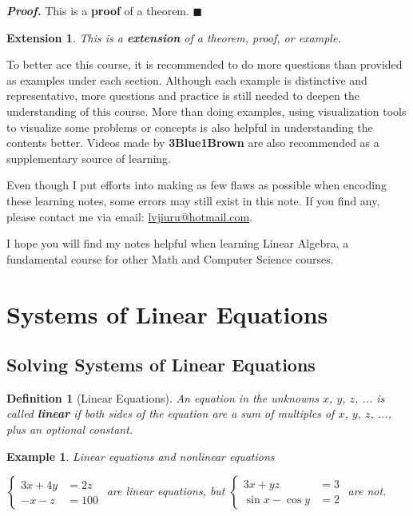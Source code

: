 \documentclass[12pt, a4paper]{article}
\newtheorem{df}{Definition}[subsection]
\newtheorem{eg}{Example}[subsection]
\newenvironment*{prf}{\indent\textbf{\textit{Proof. }}}{\hfill $\blacksquare$\par}
\newtheorem*{ext}{\indent Extension}
\begin{document}
\begin{prf}
	This is a \textbf{proof} of a theorem. 
\end{prf}
\begin{ext}
	This is a \textbf{extension} of a theorem, proof, or example. 	
\end{ext}

To better ace this course, it is recommended to do more questions than provided as examples under each section. Although each example is distinctive and representative, more questions and practice is still needed to deepen the understanding of this course. More than doing examples, using visualization tools to visualize some problems or concepts is also helpful in understanding the contents better. Videos made by \textbf{3Blue1Brown} are also recommended as a supplementary source of learning. 

Even though I put efforts into making as few flaws as possible when encoding these learning notes, some errors may still exist in this note. If you find any, please contact me via email: \url{lvjiuru@hotmail.com}. 

I hope you will find my notes helpful when learning Linear Algebra, a fundamental course for other Math and Computer Science courses. 


\newpage
\section{Systems of Linear Equations}
\subsection{Solving Systems of Linear Equations}

\begin{df}[Linear Equations]
An equation in the unknowns $x$, $y$, $z$, ... is called \textbf{linear} if both sides of the equation are a sum of multiples of $x$, $y$, $z$, ..., plus an optional constant. 
\end{df}
\begin{eg}
Linear equations and nonlinear equations\par
\begin{center}
$\left\{\begin{aligned}3x+4y&=2z\\-x-z&=100\end{aligned}\right.$ are linear equations,  but $\left\{\begin{aligned}3x+yz&=3\\\sin x-\cos y&=2\end{aligned}\right.$ are not.
\end{center}
\end{eg}
\end{document}
